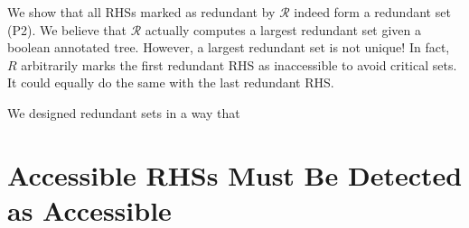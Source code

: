We show that all RHSs marked as redundant by $\mathcal{R}$ indeed form a redundant set (P2).
We believe that $\mathcal{R}$ actually computes a largest redundant set given a boolean annotated tree.
However, a largest redundant set is not unique! In fact, $R$ arbitrarily marks the first redundant RHS as inaccessible to avoid
critical sets. It could equally do the same with the last redundant RHS.



We designed redundant sets in a way that 

\section{Accessible RHSs Must Be Detected as Accessible}\label{sec:proofAcc}